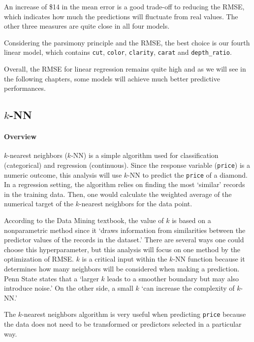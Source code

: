 \documentclass[
  paper=a4,
  ,captions=tableheading
]{scrartcl}
\begin{document}
An increase of \$14 in the mean error is a good trade-off to reducing
the RMSE, which indicates how much the predictions will fluctuate from
real values. The other three measures are quite close in all four
models.

Considering the parsimony principle and the RMSE, the best choice is our
fourth linear model, which contains \texttt{cut}, \texttt{color},
\texttt{clarity}, \texttt{carat} and \texttt{depth\_ratio}.

Overall, the RMSE for linear regression remains quite high and as we
will see in the following chapters, some models will achieve much better
predictive performances.

\hypertarget{k-nn}{%
\subsection{\texorpdfstring{\(k\)-NN}{k-NN}}\label{k-nn}}

\hypertarget{overview}{%
\paragraph{Overview}\label{overview}}

\(k\)-nearest neighbors (\(k\)-NN) is a simple algorithm used for
classification (categorical) and regression (continuous). Since the
response variable (\texttt{price}) is a numeric outcome, this analysis
will use \(k\)-NN to predict the \texttt{price} of a diamond. In a
regression setting, the algorithm relies on finding the most `similar'
records in the training data. Then, one would calculate the weighted
average of the numerical target of the \(k\)-nearest neighbors for the
data point.

According to the Data Mining textbook, the value of \(k\) is based on a
nonparametric method since it `draws information from similarities
between the predictor values of the records in the dataset.' There are
several ways one could choose this hyperparameter, but this analysis
will focus on one method by the optimization of RMSE. \(k\) is a
critical input within the \(k\)-NN function because it determines how
many neighbors will be considered when making a prediction. Penn State
states that a `larger \(k\) leads to a smoother boundary but may also
introduce noise.' On the other side, a small \(k\) `can increase the
complexity of \(k\)-NN.'

The \(k\)-nearest neighbors algorithm is very useful when predicting
\texttt{price} because the data does not need to be transformed or
predictors selected in a particular way.
\end{document}
